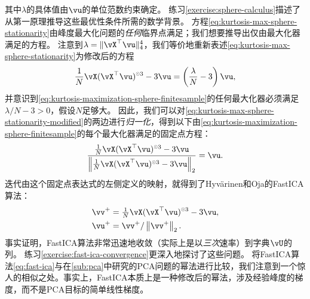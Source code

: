 \documentclass[../../book-main_zh.tex]{subfiles}
\begin{document}
其中$\lambda$的具体值由$\vu$的单位范数约束确定。
练习\ref{exercise:sphere-calculus}描述了从第一原理推导这些最优性条件所需的数学背景。
方程\eqref{eq:kurtosis-max-sphere-stationarity}由峰度最大化问题的\textit{任何}临界点满足；我们想要推导出仅由最大化器满足的方程。
注意到$\lambda = \norm{\vX^\top \vu}_4^4$，我们等价地重新表述\eqref{eq:kurtosis-max-sphere-stationarity}为修改后的方程
\begin{align}\label{eq:kurtosis-max-sphere-stationarity-modified}
   \frac{1}{N}\vX (\vX^\top \vu)^{\hada 3} 
   - 
   3 \vu
   = 
   \left(
   \frac{\lambda}{N} - 3
   \right)
   \vu,
\end{align}
并意识到\eqref{eq:kurtosis-maximization-sphere-finitesample}的任何最大化器必须满足$\lambda / N - 3 > 0$，假设$N$足够大。
因此，我们可以对\eqref{eq:kurtosis-max-sphere-stationarity-modified}的两边进行\textit{归一化}，得到以下由\eqref{eq:kurtosis-maximization-sphere-finitesample}的每个最大化器满足的固定点方程：
\begin{align}\label{eq:kurtosis-max-sphere-fxp}
\frac{
   \frac{1}{N}\vX (\vX^\top \vu)^{\hada 3} 
   - 
   3 \vu
   }{
   \norm*{
   \frac{1}{N}\vX (\vX^\top \vu)^{\hada 3} 
   - 
   3 \vu
   }_2
   }
   =
   \vu.
\end{align}
迭代由这个固定点表达式的左侧定义的映射，就得到了Hyv\"{a}rinen和Oja的FastICA算法\cite{hyvarinen-1997}：
\begin{equation}
\begin{split}\label{eq:fast-ica}
   \vv^+ &= \tfrac{1}{N}\vX (\vX^\top \vu)^{\hada 3}- 3 \vu
   ,  \\
   \vu^+ &= \vv^+ / \norm*{\vv^+}_2.
   \end{split}
\end{equation}
事实证明，FastICA算法非常迅速地收敛（实际上是以\textit{三次}速率）到字典$\vU$的列。
练习\ref{exercise:fast-ica-convergence}更深入地探讨了这些问题。
将FastICA算法\eqref{eq:fast-ica}与在\ref{sub:pca}中研究的PCA问题的幂法进行比较，我们注意到一个惊人的相似之处。事实上，FastICA本质上是一种修改后的幂法，涉及经验峰度的梯度，而不是PCA目标的简单线性梯度。

\end{document}
